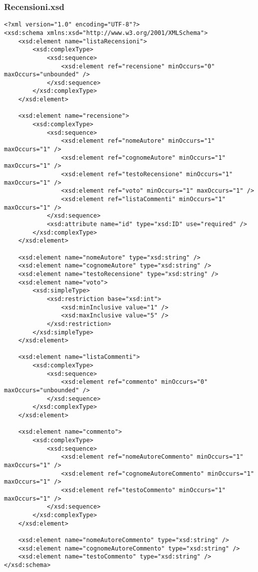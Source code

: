 \documentclass [a4paper, 12pt]{book}
\begin{document}
\subsubsection{Recensioni.xsd}
\begin{lstlisting}[style=XML]
<?xml version="1.0" encoding="UTF-8"?>
<xsd:schema xmlns:xsd="http://www.w3.org/2001/XMLSchema">
    <xsd:element name="listaRecensioni">
        <xsd:complexType>
            <xsd:sequence>
                <xsd:element ref="recensione" minOccurs="0" maxOccurs="unbounded" />
            </xsd:sequence>
        </xsd:complexType>
    </xsd:element>

    <xsd:element name="recensione">
        <xsd:complexType>
            <xsd:sequence>
                <xsd:element ref="nomeAutore" minOccurs="1" maxOccurs="1" />
                <xsd:element ref="cognomeAutore" minOccurs="1"  maxOccurs="1" />
                <xsd:element ref="testoRecensione" minOccurs="1" maxOccurs="1" />
                <xsd:element ref="voto" minOccurs="1" maxOccurs="1" />
                <xsd:element ref="listaCommenti" minOccurs="1" maxOccurs="1" />
            </xsd:sequence>
            <xsd:attribute name="id" type="xsd:ID" use="required" />
        </xsd:complexType>
    </xsd:element>

    <xsd:element name="nomeAutore" type="xsd:string" />
    <xsd:element name="cognomeAutore" type="xsd:string" />
    <xsd:element name="testoRecensione" type="xsd:string" />
    <xsd:element name="voto">
        <xsd:simpleType>
            <xsd:restriction base="xsd:int">
                <xsd:minInclusive value="1" />
                <xsd:maxInclusive value="5" />
            </xsd:restriction>
        </xsd:simpleType>
    </xsd:element>
    
    <xsd:element name="listaCommenti">
        <xsd:complexType>
            <xsd:sequence>
                <xsd:element ref="commento" minOccurs="0" maxOccurs="unbounded" />
            </xsd:sequence>
        </xsd:complexType>
    </xsd:element>

    <xsd:element name="commento">
        <xsd:complexType>
            <xsd:sequence>
                <xsd:element ref="nomeAutoreCommento" minOccurs="1" maxOccurs="1" />
                <xsd:element ref="cognomeAutoreCommento" minOccurs="1" maxOccurs="1" />
                <xsd:element ref="testoCommento" minOccurs="1" maxOccurs="1" />
            </xsd:sequence>
        </xsd:complexType>
    </xsd:element>

    <xsd:element name="nomeAutoreCommento" type="xsd:string" />
    <xsd:element name="cognomeAutoreCommento" type="xsd:string" />
    <xsd:element name="testoCommento" type="xsd:string" />
</xsd:schema>
\end{lstlisting}
\end{document}
